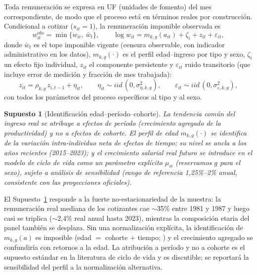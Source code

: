 \documentclass[11pt]{article}
\newtheorem{assumption}{Supuesto}
\begin{document}
Toda remuneración se expresa en UF (unidades de fomento) del mes
correspondiente, de modo que el proceso está en términos reales por
construcción. Condicional a cotizar ($s_{it}=1$), la remuneración imponible
observada es
\begin{equation}
w^{obs}_{it} = \min\{w_{it},\ \bar w_t\}, \qquad
\log w_{it} = m_{k,g}(a_{it}) + \zeta_{i} + z_{it} + \varepsilon_{it},
\label{eq:wage}
\end{equation}
donde $\bar w_t$ es el tope imponible vigente (censura observable, con
indicador administrativo en los datos), $m_{k,g}(\cdot)$ es el perfil
edad--ingreso por tipo y sexo, $\zeta_{i}$ un efecto fijo individual,
$z_{it}$ el componente persistente y
$\varepsilon_{it}$ ruido transitorio (que incluye error de medición y
fracción de mes trabajada):
\begin{equation}
z_{it} = \rho_{k,g}\, z_{i,t-1} + \eta_{it}, \qquad
\eta_{it} \sim iid\,(0, \sigma^2_{\eta,k,g}), \qquad
\varepsilon_{it} \sim iid\,(0, \sigma^2_{\varepsilon,k,g}),
\end{equation}
con todos los parámetros del proceso específicos al tipo y al sexo.

\begin{assumption}[Identificación edad--período--cohorte]
\label{as:apc}
La tendencia común del ingreso real se atribuye a efectos de período
(crecimiento agregado de la productividad) y no a efectos de cohorte. El
perfil de edad $m_{k,g}(\cdot)$ se identifica de la variación intra-individuo
neta de efectos de tiempo; su nivel se ancla a los años recientes
(2015--2023); y el crecimiento salarial real futuro se introduce en el modelo
de ciclo de vida como un parámetro explícito $\mu_w$ (reservamos $g$ para
el sexo), sujeto a análisis de
sensibilidad (rango de referencia 1,25\%--2\% anual, consistente con las
proyecciones oficiales).
\end{assumption}

El Supuesto~\ref{as:apc} responde a la fuerte no-estacionariedad de la
muestra: la remuneración real mediana de los cotizantes cae $\sim$35\% entre
1981 y 1987 y luego casi se triplica ($\sim$2,4\% real anual hasta 2023),
mientras la composición etaria del panel también se desplaza. Sin una
normalización explícita, la identificación de $m_{k,g}(a)$ es imposible
(edad $=$ cohorte $+$ tiempo; \citealp{deaton1994}) y el crecimiento agregado
se confundiría con retornos a la edad. La atribución a período y no a cohorte
es el supuesto estándar en la literatura de ciclo de vida
\citep{cocco2005} y es discutible;
se reportará la sensibilidad del perfil a la normalización alternativa.
\end{document}
